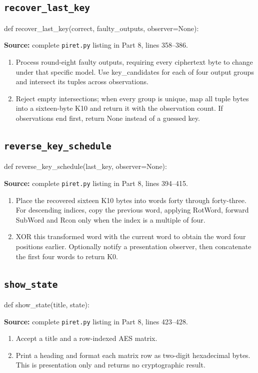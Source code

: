 \subsection{\texttt{recover\_\allowbreak{}last\_\allowbreak{}key}}
\begin{lightcode}
def recover_last_key(correct, faulty_outputs, observer=None):
\end{lightcode}
\noindent\textbf{Source:} complete \texttt{piret.py} listing in Part 8, lines 358--386.
\begin{enumerate}
\item Process round-eight faulty outputs, requiring every ciphertext byte to change under that specific model. Use key\_candidates for each of four output groups and intersect its tuples across observations.
\item Reject empty intersections; when every group is unique, map all tuple bytes into a sixteen-byte K10 and return it with the observation count. If observations end first, return None instead of a guessed key.
\end{enumerate}
\subsection{\texttt{reverse\_\allowbreak{}key\_\allowbreak{}schedule}}
\begin{lightcode}
def reverse_key_schedule(last_key, observer=None):
\end{lightcode}
\noindent\textbf{Source:} complete \texttt{piret.py} listing in Part 8, lines 394--415.
\begin{enumerate}
\item Place the recovered sixteen K10 bytes into words forty through forty-three. For descending indices, copy the previous word, applying RotWord, forward SubWord and Rcon only when the index is a multiple of four.
\item XOR this transformed word with the current word to obtain the word four positions earlier. Optionally notify a presentation observer, then concatenate the first four words to return K0.
\end{enumerate}
\subsection{\texttt{show\_\allowbreak{}state}}
\begin{lightcode}
def show_state(title, state):
\end{lightcode}
\noindent\textbf{Source:} complete \texttt{piret.py} listing in Part 8, lines 423--428.
\begin{enumerate}
\item Accept a title and a row-indexed AES matrix.
\item Print a heading and format each matrix row as two-digit hexadecimal bytes. This is presentation only and returns no cryptographic result.
\end{enumerate}

